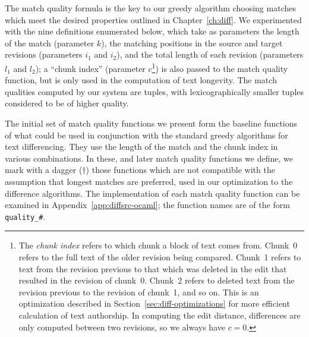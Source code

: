 The match quality formula is the key to our greedy algorithm
choosing matches which meet the desired properties outlined
in Chapter~\ref{ch:diff}.
We experimented with the nine definitions enumerated below,
which take as parameters the length of the match (parameter $k$),
the matching positions in the source and target revisions
(parameters $i_1$ and $i_2$), and the total length of
each revision (parameters $l_1$ and $l_2$);
a ``chunk index'' (parameter $c$\footnote{The \textit{chunk index} refers
to which chunk a block of text comes from.
Chunk~0 refers to the full text of the older revision being compared.
Chunk~1 refers to text from the revision previous to that which was
deleted in the edit that resulted in the revision of chunk~0.
Chunk~2 refers to deleted text from the revision previous to the
revision of chunk~1, and so on.
This is an optimization described in Section~\ref{sec:diff-optimizations}
for more efficient calculation of text authorship.
In computing the edit distance, differences are only computed
between two revisions, so we always have $c=0$.
}) is also passed to the match quality function,
but is only used in the computation of text longevity.
The match qualities computed by our system are tuples,
with lexicographically smaller tuples considered to be
of higher quality.


The initial set of match quality functions we present form the baseline
functions of what could be used in conjunction with the standard greedy
algorithms for text differencing.
They use the length of the match and the chunk index in various
combinations.
In these, and later match quality functions we define,
we mark with a dagger ($\dagger$) those functions which are
not compatible with the assumption that longest matches are
preferred, used in our  optimization
to the difference algorithms.
The implementation of each match quality function can be examined
in Appendix~\ref{app:diffsrc-ocaml}; the function names are of
the form \texttt{quality\_\#}.

